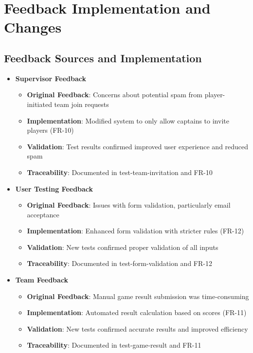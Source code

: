 \documentclass[12pt, titlepage]{article}
\begin{document}
\section{Feedback Implementation and Changes}

\subsection{Feedback Sources and Implementation}

\begin{itemize}
    \item \textbf{Supervisor Feedback}
    \begin{itemize}
        \item \textbf{Original Feedback}: Concerns about potential spam from player-initiated team join requests
        \item \textbf{Implementation}: Modified system to only allow captains to invite players (FR-10)
        \item \textbf{Validation}: Test results confirmed improved user experience and reduced spam
        \item \textbf{Traceability}: Documented in test-team-invitation and FR-10
    \end{itemize}
    
    \item \textbf{User Testing Feedback}
    \begin{itemize}
        \item \textbf{Original Feedback}: Issues with form validation, particularly email acceptance
        \item \textbf{Implementation}: Enhanced form validation with stricter rules (FR-12)
        \item \textbf{Validation}: New tests confirmed proper validation of all inputs
        \item \textbf{Traceability}: Documented in test-form-validation and FR-12
    \end{itemize}
    
    \item \textbf{Team Feedback}
    \begin{itemize}
        \item \textbf{Original Feedback}: Manual game result submission was time-consuming
        \item \textbf{Implementation}: Automated result calculation based on scores (FR-11)
        \item \textbf{Validation}: New tests confirmed accurate results and improved efficiency
        \item \textbf{Traceability}: Documented in test-game-result and FR-11
    \end{itemize}
    

\end{itemize}
\end{document}
